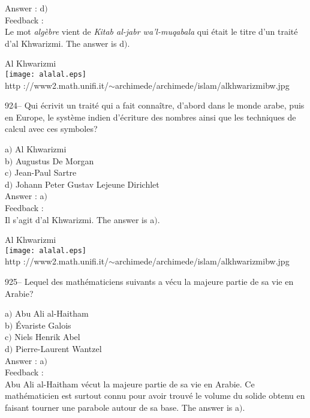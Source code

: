 ﻿\documentclass[letterpaper, 12pt]{article}
\begin{document}
Answer : d$)$\\

Feedback : \\
Le mot {\sl alg\`ebre} vient de {\sl Kitab al-jabr wa'l-muqabala} qui
\'etait le titre d'un trait\'e d'al Khwarizmi. The answer is d$)$.\\

        \begin{center}
        Al Khwarizmi\\
    \texttt{[image: alalal.eps]}\\
        {\footnotesize http
://www2.math.unifi.it/$\sim$archimede/archimede/islam/alkhwarizmibw.jpg}
    \end{center}

924-- Qui \'ecrivit un trait\'e qui a fait conna\^itre, d'abord dans
le monde arabe, puis en Europe, le syst\`eme indien d'\'ecriture des
nombres ainsi que les techniques de calcul avec ces symboles?

a$)$ Al Khwarizmi \\
b$)$ Augustus De Morgan \\
c$)$ Jean-Paul Sartre \\
d$)$ Johann Peter Gustav Lejeune Dirichlet\\

Answer : a$)$\\

Feedback :\\
Il s'agit d'al Khwarizmi. The answer is a$)$.\\

        \begin{center}
        Al Khwarizmi\\
    \texttt{[image: alalal.eps]}\\
        {\footnotesize http
://www2.math.unifi.it/$\sim$archimede/archimede/islam/alkhwarizmibw.jpg}
    \end{center}

925-- Lequel des math\'ematiciens suivants a v\'ecu la majeure
partie de sa vie en Arabie?

a$)$ Abu Ali al-Haitham \\
b$)$ \'Evariste Galois \\
c$)$ Niels Henrik Abel \\
d$)$ Pierre-Laurent Wantzel \\

Answer : a$)$\\

Feedback : \\
Abu Ali al-Haitham v\'ecut la majeure partie de sa vie en Arabie. Ce
math\'ematicien est surtout connu pour avoir trouv\'e le volume du
solide obtenu en faisant tourner une parabole
autour de sa base. The answer is a$)$.\\
\end{document}
